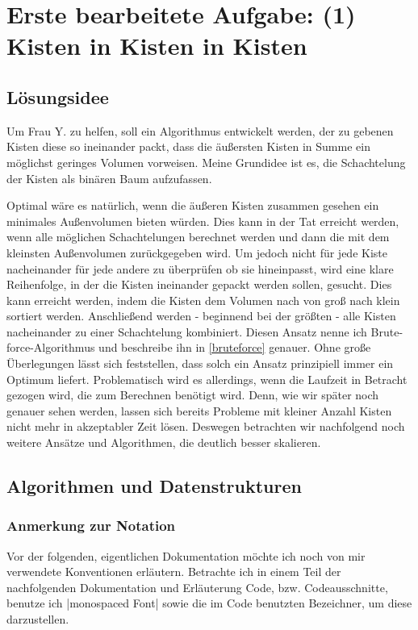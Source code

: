 \lstset{language=Scala}
\chapter[Erste bearbeitete Aufgabe: (1) Kisten in Kisten in Kisten]{Erste bearbeitete Aufgabe: \newline (1) Kisten in Kisten in Kisten}
\minitoc
\clearpage
\section{Lösungsidee}
 Um Frau Y. zu helfen, soll ein Algorithmus entwickelt werden, der zu gebenen Kisten diese so ineinander packt,
 dass die äußersten Kisten in Summe ein möglichst geringes Volumen vorweisen.
 Meine Grundidee ist es, die Schachtelung der Kisten als binären Baum aufzufassen.

 Optimal wäre es natürlich, wenn die äußeren Kisten zusammen gesehen ein minimales Außenvolumen bieten würden.
 Dies kann in der Tat erreicht werden, wenn alle möglichen Schachtelungen berechnet werden und dann die mit dem kleinsten Außenvolumen zurückgegeben wird.
 Um jedoch nicht für jede Kiste nacheinander für jede andere zu überprüfen ob sie hineinpasst, wird eine klare Reihenfolge, in der die Kisten ineinander gepackt werden sollen, gesucht.
 Dies kann erreicht werden, indem die Kisten dem Volumen nach von groß nach klein sortiert werden.
 Anschließend werden - beginnend bei der größten - alle Kisten nacheinander zu einer Schachtelung kombiniert.
 Diesen Ansatz nenne ich Brute-force-Algorithmus und beschreibe ihn in \ref{bruteforce} genauer.
 Ohne große Überlegungen lässt sich feststellen, dass solch ein Ansatz prinzipiell immer ein Optimum liefert.
 Problematisch wird es allerdings, wenn die Laufzeit in Betracht gezogen wird, die zum Berechnen benötigt wird.
 Denn, wie wir später noch genauer sehen werden, lassen sich bereits Probleme mit kleiner Anzahl Kisten nicht mehr in akzeptabler Zeit lösen.
 Deswegen betrachten wir nachfolgend noch weitere Ansätze und Algorithmen, die deutlich besser skalieren.
\section{Algorithmen und Datenstrukturen}
\subsection{Anmerkung zur Notation}
 Vor der folgenden, eigentlichen Dokumentation möchte ich noch von mir verwendete Konventionen erläutern.
 Betrachte ich in einem Teil der nachfolgenden Dokumentation und Erläuterung Code, bzw. Codeausschnitte,
 benutze ich |monospaced Font| sowie die im Code benutzten Bezeichner, um diese darzustellen.

